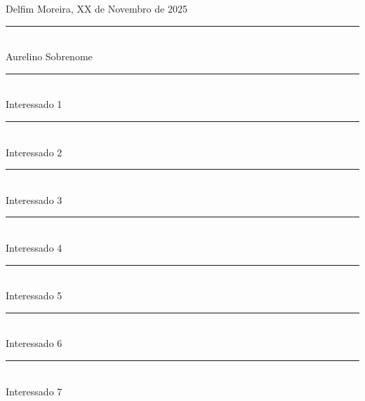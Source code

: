 \documentclass[12pt]{article}
\begin{document}




\vspace{2em}

\begin{flushright}
Delfim Moreira, XX de Novembro de 2025\vspace{2em}
\rule{10cm}{0.5pt}\\Aurelino Sobrenome\\[2em]
\rule{10cm}{0.5pt}\\Interessado 1\\[2em]
\rule{10cm}{0.5pt}\\Interessado 2\\[2em]
\rule{10cm}{0.5pt}\\Interessado 3\\[2em]
\rule{10cm}{0.5pt}\\Interessado 4\\[2em]
\rule{10cm}{0.5pt}\\Interessado 5\\[2em]
\rule{10cm}{0.5pt}\\Interessado 6\\[2em]
\rule{10cm}{0.5pt}\\Interessado 7\\[2em]
\end{flushright}
\end{document}
